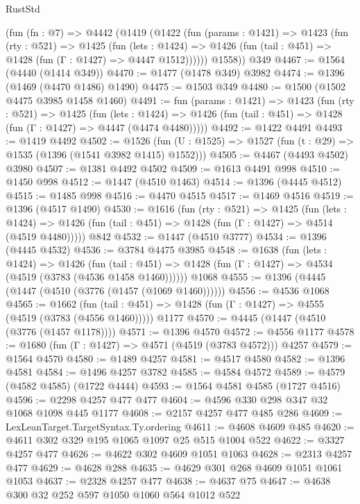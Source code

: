 \begin{lexlean}{RustStd}
\begin{coremodule}
{\begin{coremodule}
{{{{{{{{{{{    (fun (fn : @7) =>
    @4442
      (@1419
        (@1422
          (fun (params : @1421) =>
          @1423
            (fun (rty : @521) =>
            @1425
              (fun (lets : @1424) =>
              @1426 (fun (tail : @451) => @1428 (fun (Γ : @1427) => @4447 @1512))))))
        @1558))
    @349
@4467 := @1564 (@4440 (@1414 @349))
@4470 := @1477 (@1478 @349) @3982
@4474 := @1396 (@1469 (@4470 @1486) @1490)
@4475 := @1503 @349
@4480 := @1500 (@1502 @4475 @3985 @1458 @1460)
@4491 := fun (params : @1421) =>
  @1423
    (fun (rty : @521) =>
    @1425
      (fun (lets : @1424) =>
      @1426 (fun (tail : @451) => @1428 (fun (Γ : @1427) => @4447 (@4474 @4480)))))
@4492 := @1422 @4491
@4493 := @1419 @4492
@4502 := @1526 (fun (U : @1525) => @1527 (fun (t : @29) => @1535 (@1396 (@1541 @3982 @1415) @1552)))
@4505 := @4467 (@4493 @4502) @3980
@4507 := @1381 @4492 @4502
@4509 := @1613 @4491 @998
@4510 := @1450 @998
@4512 := @1447 (@4510 @1463)
@4514 := @1396 (@4445 @4512)
@4515 := @1485 @998
@4516 := @4470 @4515
@4517 := @1469 @4516
@4519 := @1396 (@4517 @1490)
@4530 := @1616
    (fun (rty : @521) =>
    @1425
      (fun (lets : @1424) =>
      @1426 (fun (tail : @451) => @1428 (fun (Γ : @1427) => @4514 (@4519 @4480)))))
    @842
@4532 := @1447 (@4510 @3777)
@4534 := @1396 (@4445 @4532)
@4536 := @3784 @4475 @3985
@4548 := @1638
    (fun (lets : @1424) =>
    @1426
      (fun (tail : @451) => @1428 (fun (Γ : @1427) => @4534 (@4519 (@3783 (@4536 @1458 @1460))))))
    @1068
@4555 := @1396 (@4445 (@1447 (@4510 (@3776 (@1457 (@1069 @1460))))))
@4556 := @4536 @1068
@4565 := @1662
    (fun (tail : @451) => @1428 (fun (Γ : @1427) => @4555 (@4519 (@3783 (@4556 @1460)))))
    @1177
@4570 := @4445 (@1447 (@4510 (@3776 (@1457 @1178))))
@4571 := @1396 @4570
@4572 := @4556 @1177
@4578 := @1680 (fun (Γ : @1427) => @4571 (@4519 (@3783 @4572))) @4257
@4579 := @1564 @4570
@4580 := @1489 @4257
@4581 := @4517 @4580
@4582 := @1396 @4581
@4584 := @1496 @4257 @3782
@4585 := @4584 @4572
@4589 := @4579 (@4582 @4585) (@1722 @4444)
@4593 := @1564 @4581 @4585 (@1727 @4516)
@4596 := @2298 @4257 @477 @477
@4604 := @4596 @330 @298 @347 @32 @1068 @1098 @445 @1177
@4608 := @2157 @4257 @477 @485 @286
@4609 := LexLeanTarget.TargetSyntax.Ty.ordering
@4611 := @4608 @4609 @485
@4620 := @4611 @302 @329 @195 @1065 @1097 @25 @515 @1004 @522
@4622 := @3327 @4257 @477
@4626 := @4622 @302 @4609 @1051 @1063
@4628 := @2313 @4257 @477
@4629 := @4628 @288
@4635 := @4629 @301 @268 @4609 @1051 @1061 @1053
@4637 := @2328 @4257 @477
@4638 := @4637 @75
@4647 := @4638 @300 @32 @252 @597 @1050 @1060 @564 @1012 @522
}}}}}}}}}}}
\end{coremodule}}
\end{coremodule}
\end{lexlean}
